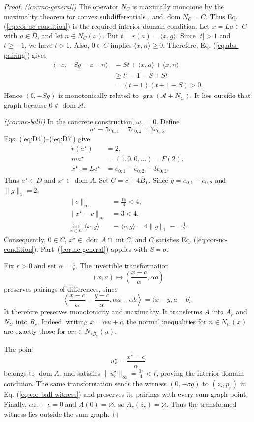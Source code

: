 \documentclass[11pt]{article}
\newcommand{\gra}{\operatorname{gra}}
\newcommand{\dom}{\operatorname{dom}}
\newcommand{\pair}[2]{\langle #1,#2\rangle}
\theoremstyle{definition}
\theoremstyle{remark}
\begin{document}
\begin{proof}
\noindent\textit{\textup{(\ref{cor:nc-general})}}
The operator $N_C$ is maximally monotone by the maximality theorem for convex subdifferentials \cite{rockafellar1970subdiff}, and $\dom N_C=C$. Thus Eq. (\ref{eq:cor-nc-condition}) is the required interior-domain condition. Let $x=La\in C$ with $a\in D$, and let $n\in N_C(x)$. Put $t=r(a)=\pair{x}{g}$. Since $|t|>1$ and $t\ge-1$, we have $t>1$. Also, $0\in C$ implies $\pair{x}{n}\ge0$. Therefore, Eq. (\ref{eq:abs-pairing}) gives
\[
\begin{aligned}
\pair{-x}{-Sg-a-n}
&=St+\pair{x}{a}+\pair{x}{n}\\
&\ge t^2-1-S+St\\
&=(t-1)(t+1+S)>0.
\end{aligned}
\]
Hence $(0,-Sg)$ is monotonically related to $\gra(\mathcal A+N_C)$. It lies outside that graph because $0\notin\dom\mathcal A$.

\noindent\textit{\textup{(\ref{cor:nc-ball})}}
In the concrete construction, $\omega_1=0$. Define
\[
a^\star=5e_{0,1}-7e_{0,2}+3e_{0,3}.
\]
Eqs. (\ref{eq:D4})--(\ref{eq:D7}) give
\[
\begin{aligned}
r(a^\star)&=2,\\
ma^\star&=(1,0,0,\ldots)=F(2),\\
x^\star:=La^\star&=e_{0,1}-e_{0,2}-3e_{0,3}.
\end{aligned}
\]
Thus $a^\star\in D$ and $x^\star\in\dom A$. Set $C=c+4\overline B_Y$. Since $g=e_{0,1}-e_{0,2}$ and $\|g\|_1=2$,
\[
\begin{aligned}
\|c\|_\infty&=\frac{15}{4}<4,\\
\|x^\star-c\|_\infty&=3<4,\\
\inf_{x\in C}\pair{x}{g}
&=\pair{c}{g}-4\|g\|_1=-\frac12.
\end{aligned}
\]
Consequently, $0\in C$, $x^\star\in\dom A\cap\operatorname{int}C$, and $C$ satisfies Eq. (\ref{eq:cor-nc-condition}). Part~\textup{(\ref{cor:nc-general})} applies with $S=\sigma$.

Fix $r>0$ and set $\alpha=\frac4r$. The invertible transformation
\[
(x,a)\longmapsto\left(\frac{x-c}{\alpha},\alpha a\right)
\]
preserves pairings of differences, since
\[
\left\langle
\frac{x-c}{\alpha}-\frac{y-c}{\alpha},
\alpha a-\alpha b
\right\rangle
=\pair{x-y}{a-b}.
\]
It therefore preserves monotonicity and maximality. It transforms $A$ into $A_r$ and $N_C$ into $B_r$. Indeed, writing $x=\alpha u+c$, the normal inequalities for $n\in N_C(x)$ are exactly those for $\alpha n\in N_{r\overline B_Y}(u)$.

The point
\[
u_r^\star=\frac{x^\star-c}{\alpha}
\]
belongs to $\dom A_r$ and satisfies $\|u_r^\star\|_\infty=\frac{3r}{4}<r$, proving the interior-domain condition. The same transformation sends the witness $(0,-\sigma g)$ to $(z_r,p_r)$ in Eq. (\ref{eq:cor-ball-witness}) and preserves its pairings with every sum graph point. Finally, $\alpha z_r+c=0$ and $A(0)=\varnothing$, so $A_r(z_r)=\varnothing$. Thus the transformed witness lies outside the sum graph.
\end{proof}
\end{document}
